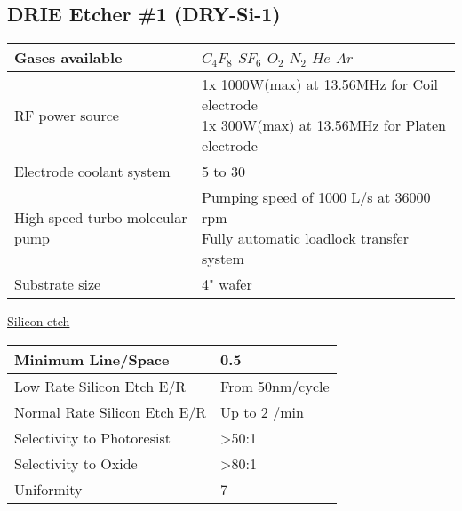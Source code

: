 \subsection{DRIE Etcher \#1 (DRY-Si-1)}\label{dry_DRIE_etcher}
\WaferClean

	\begin{tabular}{|p{6cm}|p{8cm}|}
		\hline
		Gases available
		&
		\makecell[l]{
			\tabitem $C_4 F_8$ \\
			\tabitem $S F_6$ \\
			\tabitem $O_2$ \\
			\tabitem $N_2$ \\
			\tabitem  $He$ \\
			\tabitem $Ar$
		} \\
		\hline
		RF power source
		&
		\makecell[l]{
			\tabitem 1x 1000W(max) at 13.56MHz for Coil electrode \\
			\tabitem 1x 300W(max) at 13.56MHz for Platen electrode
		} \\
		\hline
		Electrode coolant system
		&
		5 to 30 \degreesC \\
		\hline
		High speed turbo molecular pump
		&
		\makecell[l]{
			\tabitem Pumping speed of 1000 L/s at 36000 rpm \\
			\tabitem Fully automatic loadlock transfer system
		} \\
		\hline
		Substrate size
		&
		4" wafer \\
		\hline
	\end{tabular}

	\underline{Silicon etch}

	\begin{tabular}{|p{6cm}|p{8cm}|}
		\hline
		Minimum Line/Space
		&
		0.5 \um
		\\
		\hline
		Low Rate Silicon Etch E/R
		&
		From 50nm/cycle \\
		\hline
		Normal Rate Silicon Etch E/R
		&
		Up to 2 \um/min\\
		\hline
		Selectivity to Photoresist
		&
		>50:1 \\
		\hline
		Selectivity to Oxide
		&
		>80:1 \\
		\hline
		Uniformity
		&
		7\percent \\
		\hline
	\end{tabular}
